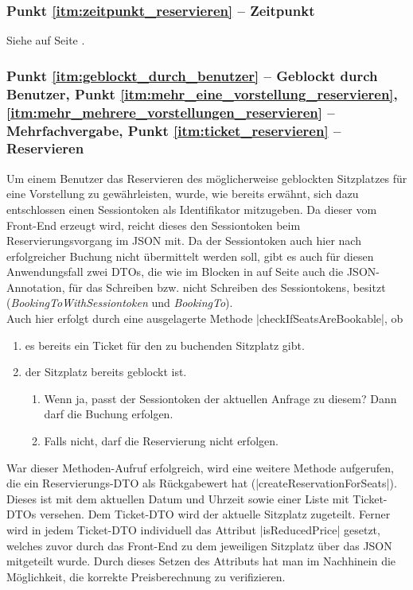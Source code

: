 \subsubsection*{Punkt \ref{itm:zeitpunkt_reservieren} -- Zeitpunkt}
\label{ssssec:Zeitpunkt_reservieren}
Siehe   auf Seite \pageref{ssssec:Zeitpunkt}. 

\subsubsection*{Punkt \ref{itm:geblockt_durch_benutzer} -- Geblockt durch Benutzer, Punkt \ref{itm:mehr_eine_vorstellung_reservieren}, \ref{itm:mehr_mehrere_vorstellungen_reservieren} -- Mehrfachvergabe, Punkt \ref{itm:ticket_reservieren} -- Reservieren}
\label{ssssec:geblockt_durch_benutzer}
Um einem Benutzer das Reservieren des möglicherweise geblockten Sitzplatzes für eine Vorstellung zu gewährleisten, wurde, wie bereits erwähnt, sich dazu entschlossen einen Sessiontoken als Identifikator mitzugeben. 
Da dieser vom Front-End erzeugt wird, reicht dieses den Sessiontoken beim Reservierungsvorgang im \acs{JSON} mit.
Da der Sessiontoken auch hier nach erfolgreicher Buchung nicht übermittelt werden soll, gibt es auch für diesen Anwendungsfall zwei \acp{DTO}, die wie im  Blocken in  auf Seite \pageref{ssssec:Bezeichner} auch die \acs{JSON}-Annotation, für das Schreiben bzw. nicht Schreiben des Sessiontokens, besitzt (\textit{BookingToWithSessiontoken} und \textit{BookingTo}). \\

Auch hier erfolgt durch eine ausgelagerte Methode \jinline |checkIfSeatsAreBookable|, ob 
\begin{enumerate}
	\item es bereits ein Ticket für den zu buchenden Sitzplatz gibt.
	\item der Sitzplatz bereits geblockt ist.
	\begin{enumerate}
		\item Wenn ja, passt der Sessiontoken der aktuellen Anfrage zu diesem? Dann darf die Buchung erfolgen.
		\item Falls nicht, darf die Reservierung nicht erfolgen. 
	\end{enumerate}
\end{enumerate}

War dieser Methoden-Aufruf erfolgreich, wird eine weitere Methode aufgerufen, die ein Reservierungs-\acs{DTO} als Rückgabewert hat (\jinline |createReservationForSeats|). \\
Dieses ist mit dem aktuellen Datum und Uhrzeit sowie einer Liste mit Ticket-\acp{DTO} versehen. 
Dem Ticket-\acs{DTO} wird der aktuelle Sitzplatz zugeteilt. 
Ferner wird in jedem Ticket-\acs{DTO} individuell das Attribut \jinline |isReducedPrice| gesetzt, welches zuvor durch das Front-End zu dem jeweiligen Sitzplatz über das \acs{JSON} mitgeteilt wurde. Durch dieses Setzen des Attributs hat man im Nachhinein die Möglichkeit, die korrekte Preisberechnung zu verifizieren. \\

